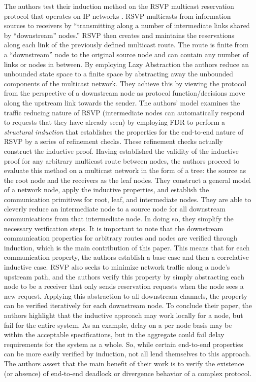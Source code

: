 \documentclass[10pt, journal]{IEEEtran}
\begin{document}
\bigbreak
The authors test their induction method on the RSVP multicast reservation protocol that operates on IP networks \cite{rfc2205}. RSVP multicasts from information sources to receivers by ``transmitting along a number of intermediate links shared by ``downstream'' nodes.'' RSVP then creates and maintains the reservations along each link of the previously defined multicast route. The route is finite from a ``downstream'' node to the original source node and can contain any number of links or nodes in between.
\bigbreak
By employing Lazy Abstraction the authors reduce an unbounded state space to a finite space by abstracting away the unbounded components of the multicast network. They achieve this by viewing the protocol from the perspective of a downstream node as protocol function/decisions move along the upstream link towards the sender.
\bigbreak
The authors' model examines the traffic reducing nature of RSVP (intermediate nodes can automatically respond to requests that they have already seen) by employing FDR to perform a \textit{structural induction} that establishes the properties for the end-to-end nature of RSVP by a series of refinement checks. These refinement checks actually construct the inductive proof. Having established the validity of the inductive proof for any arbitrary multicast route between nodes, the authors proceed to evaluate this method on a multicast network in the form of a tree: the source as the root node and the receivers as the leaf nodes. They construct a general model of a network node, apply the inductive properties, and establish the communication primitives for root, leaf, and intermediate nodes. They are able to cleverly reduce an intermediate node to a source node for all downstream communications from that intermediate node. In doing so, they simplify the necessary verification steps. It is important to note that the downstream communication properties for arbitrary routes and nodes are verified through induction, which is the main contribution of this paper. This means that for each communication property, the authors establish a base case and then a correlative inductive case. RSVP also seeks to minimize network traffic along a node's upstream path, and the authors verify this property by simply abstracting each node to be a receiver that only sends reservation requests when the node sees a new request. Applying this abstraction to all downstream channels, the property can be verified iteratively for each downstream node. 
\bigbreak
To conclude their paper, the authors highlight that the inductive approach may work locally for a node, but fail for the entire system. As an example, delay on a per node basis may be within the acceptable specifications, but in the aggregate could fail delay requirements for the system as a whole. So, while certain end-to-end properties can be more easily verified by induction, not all lend themselves to this approach. The authors assert that the main benefit of their work is to verify the existence (or absence) of end-to-end deadlock or divergence behavior of a complex protocol. 
\end{document}
